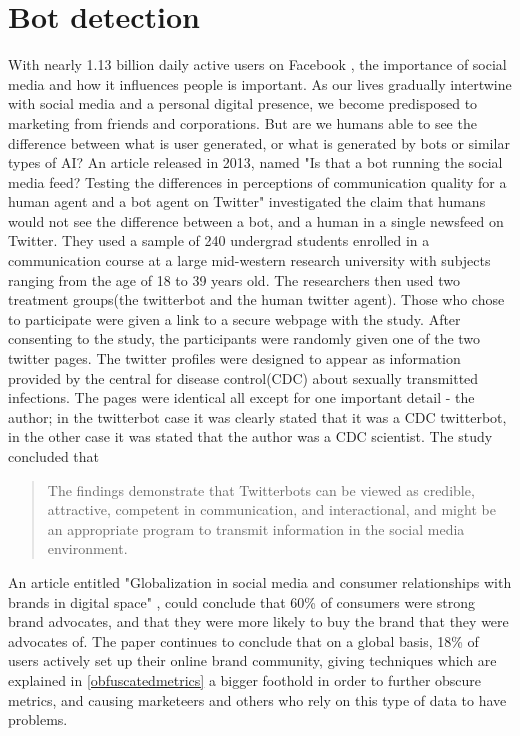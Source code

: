 \section{Bot detection}
With nearly 1.13 billion daily active users on Facebook \cite{FB:stats}, the importance of social media and how it influences people is important. As our lives gradually intertwine with social media and a personal digital presence, we become predisposed to marketing from friends and corporations.  But are we humans able to see the difference between what is user generated, or what is generated by bots or similar types of AI?
An article released in 2013, named "Is that a bot running the social media feed? Testing the differences in perceptions of communication quality for a human agent and a bot agent on Twitter"\cite{Edwards2014372} investigated the claim that humans would not see the difference between a bot, and a human in a single newsfeed on Twitter. They used a sample of 240 undergrad students enrolled in a communication course at a large mid-western research university with subjects ranging from the age of 18 to 39 years old. The researchers then used two treatment groups(the twitterbot and the human twitter agent). Those who chose to participate were given a link to a secure webpage with the study. After consenting to the study, the participants were randomly given one of the two twitter pages. The twitter profiles were designed to appear as information provided by the central for disease control(CDC) about sexually transmitted infections. The pages were identical all except for one important detail - the author; in the twitterbot case it was clearly stated that it was a CDC twitterbot, in the other case it was stated that the author was a CDC scientist. The study concluded that
 \begin{quote} \label{emil:runningbotfeed}
The findings demonstrate that Twitterbots can be viewed as credible, attractive,
competent in communication, and interactional, and might be an
appropriate program to transmit information in the social media
environment. 
\newline \mbox{} \hfill \cite{Edwards2014372}

\end{quote}
An article entitled "Globalization in social media and consumer relationships with brands in digital space" \cite{6959277120111201}, could conclude that 60\% of consumers\cite{6959277120111201} were strong brand advocates, and that they were more likely to buy the brand that they were advocates of. The paper continues to conclude that on a global basis, 18\% of users actively set up their online brand community\cite{6959277120111201}, giving techniques which are explained in \ref{obfuscatedmetrics} a bigger foothold in order to further obscure metrics, and causing marketeers and others who rely on this type of data to have problems.
